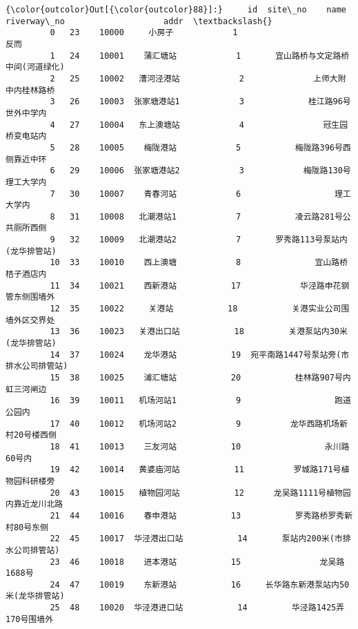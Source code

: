 \documentclass[11pt]{article}
\begin{document}
\begin{Verbatim}[commandchars=\\\{\}]
{\color{outcolor}Out[{\color{outcolor}88}]:}     id  site\_no    name  riverway\_no                    addr  \textbackslash{}
         0   23    10000     小房子            1                      反而   
         1   24    10001    蒲汇塘站            1       宜山路桥与文定路桥中间(河道绿化)   
         2   25    10002   漕河泾港站            2              上师大附中内桂林路桥   
         3   26    10003  张家塘港站1            3             桂江路96号世外中学内   
         4   27    10004   东上澳塘站            4                冠生园桥变电站内   
         5   28    10005    梅陇港站            5           梅陇路396号西侧靠近中环   
         6   29    10006  张家塘港站2            3            梅陇路130号理工大学内   
         7   30    10007    青春河站            6                   理工大学内   
         8   31    10008   北潮港站1            7           凌云路281号公共厕所西侧   
         9   32    10009   北潮港站2            7       罗秀路113号泵站内(龙华排管站)   
         10  33    10010    西上澳塘            8               宜山路桥桔子酒店内   
         11  34    10021    西新港站           17            华泾路申花钢管东侧围墙外   
         12  35    10022     关港站           18           关港实业公司围墙外区交界处   
         13  36    10023   关港出口站           18         关港泵站内30米(龙华排管站)   
         14  37    10024    龙华港站           19  宛平南路1447号泵站旁(市排水公司排管站)   
         15  38    10025    浦汇塘站           20           桂林路907号内虹三河闸边   
         16  39    10011   机场河站1            9                   跑道公园内   
         17  40    10012   机场河站2            9          龙华西路机场新村20号楼西侧   
         18  41    10013    三友河站           10                 永川路60号内   
         19  42    10014   黄婆庙河站           11          罗城路171号植物园科研楼旁   
         20  43    10015   植物园河站           12      龙吴路1111号植物园内靠近龙川北路   
         21  44    10016    春申港站           13           罗秀路桥罗秀新村80号东侧   
         22  45    10017  华泾港出口站           14       泵站内200米(市排水公司排管站)   
         23  46    10018    进本港站           15                龙吴路1688号   
         24  47    10019    东新港站           16     长华路东新港泵站内50米(龙华排管站)   
         25  48    10020  华泾港进口站           14         华泾路1425弄170号围墙外   
         

\end{Verbatim}
\end{document}
